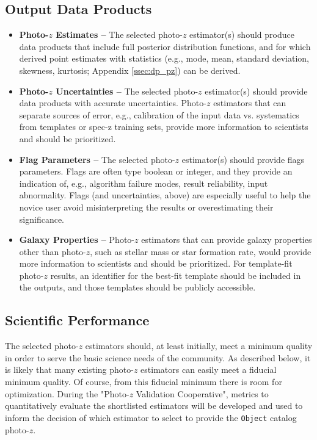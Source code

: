 \documentclass[DM,authoryear,toc]{lsstdoc}
\begin{document}
\subsection{Output Data Products} 
\begin{itemize}
\item \textbf{Photo-$z$ Estimates -- } 
The selected photo-$z$ estimator(s) should produce data products that include full posterior distribution functions, and for which derived point estimates with statistics (e.g., mode, mean, standard deviation, skewness, kurtosis; Appendix \ref{ssec:dp_pz}) can be derived.
\item \textbf{Photo-$z$ Uncertainties -- }
The selected photo-$z$ estimator(s) should provide data products with accurate uncertainties.
Photo-$z$ estimators that can separate sources of error, e.g., calibration of the input data vs. systematics from templates or spec-z training sets, provide more information to scientists and should be prioritized.
\item \textbf{Flag Parameters -- }
The selected photo-$z$ estimator(s) should provide flags parameters.
Flags are often type boolean or integer, and they provide an indication of, e.g., algorithm failure modes, result reliability, input abnormality.
Flags (and uncertainties, above) are especially useful to help the novice user avoid misinterpreting the results or overestimating their significance.
\item \textbf{Galaxy Properties -- }
Photo-$z$ estimators that can provide galaxy properties other than photo-$z$, such as stellar mass or star formation rate, would provide more information to scientists and should be prioritized.
For template-fit photo-$z$ results, an identifier for the best-fit template should be included in the outputs, and those templates should be publicly accessible.
\end{itemize}

\subsection{Scientific Performance}

The selected photo-$z$ estimators should, at least initially, meet a minimum quality in order to serve the basic science needs of the community.
As described below, it is likely that many existing photo-$z$ estimators can easily meet a fiducial minimum quality.
Of course, from this fiducial minimum there is room for optimization.
During the "Photo-$z$ Validation Cooperative", metrics to quantitatively evaluate the shortlisted estimators will be developed and used to inform the decision of which estimator to select to provide the {\tt Object} catalog photo-$z$.
\end{document}
